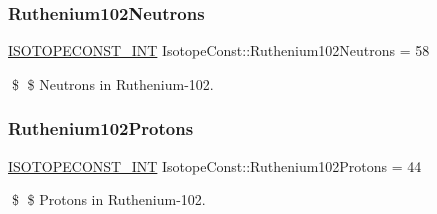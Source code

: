 \subsubsection{\texorpdfstring{Ruthenium102\+Neutrons}{Ruthenium102Neutrons}}
{\footnotesize\ttfamily \mbox{\hyperlink{group___isotope_const-_macros_ga5f18360b3e99483a35c32d789e62621c}{I\+S\+O\+T\+O\+P\+E\+C\+O\+N\+S\+T\+\_\+\+I\+NT}} Isotope\+Const\+::\+Ruthenium102\+Neutrons = 58}

\$ \$ Neutrons in Ruthenium-\/102. \mbox{\label{group___isotope_const-_ruthenium-_ru102_ga91ef36edf99d51137a9733dd0f7cd8a7}} 
\subsubsection{\texorpdfstring{Ruthenium102\+Protons}{Ruthenium102Protons}}
{\footnotesize\ttfamily \mbox{\hyperlink{group___isotope_const-_macros_ga5f18360b3e99483a35c32d789e62621c}{I\+S\+O\+T\+O\+P\+E\+C\+O\+N\+S\+T\+\_\+\+I\+NT}} Isotope\+Const\+::\+Ruthenium102\+Protons = 44}

\$ \$ Protons in Ruthenium-\/102. 